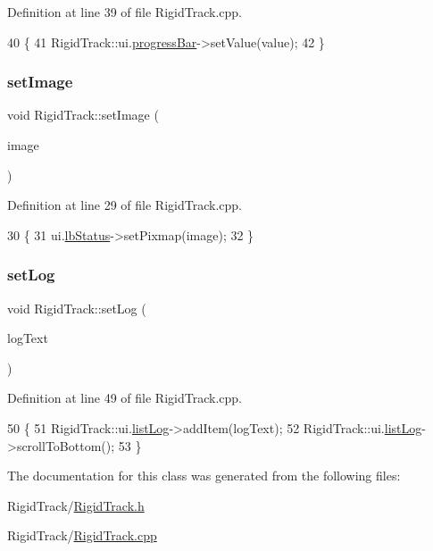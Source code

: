 Definition at line 39 of file Rigid\+Track.\+cpp.


\begin{DoxyCode}
40 \{
41     RigidTrack::ui.\hyperlink{class_ui___rigid_track_class_a4f53c207d82dc9555709f1ace400d89b}{progressBar}->setValue(value);
42 \}
\end{DoxyCode}
\mbox{\label{class_rigid_track_a3b0b3835204cad40abdb144d24aefc76}} 
\subsubsection{\texorpdfstring{set\+Image}{setImage}}
{\footnotesize\ttfamily void Rigid\+Track\+::set\+Image (\begin{DoxyParamCaption}\item[{Q\+Pixmap}]{image }\end{DoxyParamCaption})\hspace{0.3cm}{\ttfamily [slot]}}



Definition at line 29 of file Rigid\+Track.\+cpp.


\begin{DoxyCode}
30 \{
31     ui.\hyperlink{class_ui___rigid_track_class_abeac37c5be33dbe8f2805a9e688b8329}{lbStatus}->setPixmap(image);
32 \}
\end{DoxyCode}
\mbox{\label{class_rigid_track_a54a029af74a21f92749e99df7ed847b2}} 
\subsubsection{\texorpdfstring{set\+Log}{setLog}}
{\footnotesize\ttfamily void Rigid\+Track\+::set\+Log (\begin{DoxyParamCaption}\item[{Q\+String}]{log\+Text }\end{DoxyParamCaption})\hspace{0.3cm}{\ttfamily [slot]}}



Definition at line 49 of file Rigid\+Track.\+cpp.


\begin{DoxyCode}
50 \{
51     RigidTrack::ui.\hyperlink{class_ui___rigid_track_class_a8573490fa3f39f7c45af77f33c9b9297}{listLog}->addItem(logText);
52     RigidTrack::ui.\hyperlink{class_ui___rigid_track_class_a8573490fa3f39f7c45af77f33c9b9297}{listLog}->scrollToBottom();
53 \}
\end{DoxyCode}


The documentation for this class was generated from the following files\+:\begin{DoxyCompactItemize}
\item 
Rigid\+Track/\hyperlink{_rigid_track_8h}{Rigid\+Track.\+h}\item 
Rigid\+Track/\hyperlink{_rigid_track_8cpp}{Rigid\+Track.\+cpp}\end{DoxyCompactItemize}
